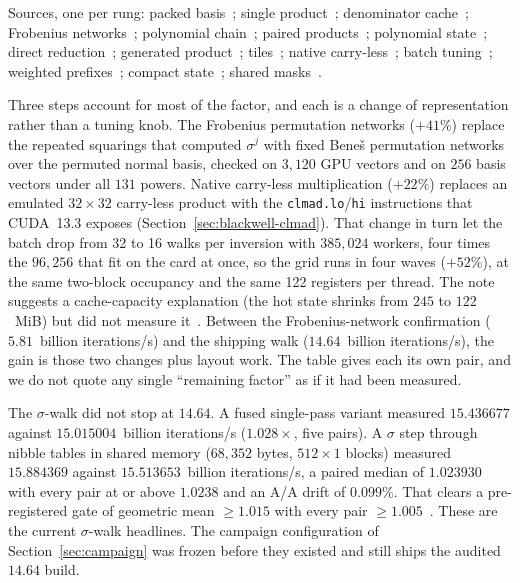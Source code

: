 Sources, one per rung: packed basis~; single
product~; denominator
cache~; Frobenius
networks~; polynomial
chain~; paired
products~; polynomial
state~; direct
reduction~; generated
product~; tiles~;
native carry-less~; batch
tuning~; weighted
prefixes~; compact
state~; shared
masks~.




Three steps account for most of the factor, and each is a change of
representation rather than a tuning knob. The Frobenius permutation
networks ($+41\%$) replace the repeated squarings that computed
$\sigma^j$ with fixed Bene\v{s} permutation networks over the permuted
normal basis,
checked on $3{,}120$ GPU vectors and on $256$ basis vectors under all
$131$ powers. Native carry-less multiplication ($+22\%$) replaces an
emulated $32\times32$ carry-less product with the
\texttt{clmad.lo}/\texttt{hi} instructions that CUDA~13.3 exposes
(Section~\ref{sec:blackwell-clmad}). That change in turn let the batch drop from 32 to 16 walks
per inversion with $385{,}024$ workers, four times the $96{,}256$ that
fit on the card at once, so the grid runs in four waves ($+52\%$), at the
same two-block occupancy and the same 122 registers per thread. The note
suggests a cache-capacity explanation (the hot state shrinks from $245$
to $122$~MiB) but did not measure it~.
Between the Frobenius-network confirmation ($5.81$~billion iterations/s) and the
shipping walk ($14.64$~billion iterations/s), the gain is those two changes plus layout
work. The table gives each its own pair, and we do not quote any single
``remaining factor'' as if it had been measured.

The $\sigma$-walk did not stop at $14.64$. A fused single-pass variant
measured $15.436677$ against $15.015004$~billion iterations/s ($1.028\times$, five
pairs). A $\sigma$ step through nibble tables in shared memory
($68{,}352$ bytes, $512\times1$ blocks) measured $15.884369$ against
$15.513653$~billion iterations/s, a paired median of $1.023930$ with every pair at or
above $1.0238$ and an A/A drift of $0.099\%$. That clears a
pre-registered gate of geometric mean $\ge1.015$ with every pair
$\ge1.005$~.
These are the current $\sigma$-walk headlines. The campaign
configuration of Section~\ref{sec:campaign} was frozen before they
existed and still ships the audited $14.64$ build.

